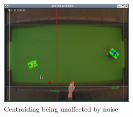 \begin{figure}[h]
  \caption{Centroiding being unaffected by noise}
  \label{vis3}
  \centering
    \includegraphics[width=0.6\textwidth]{randy_bins_after.png}
\end{figure}



